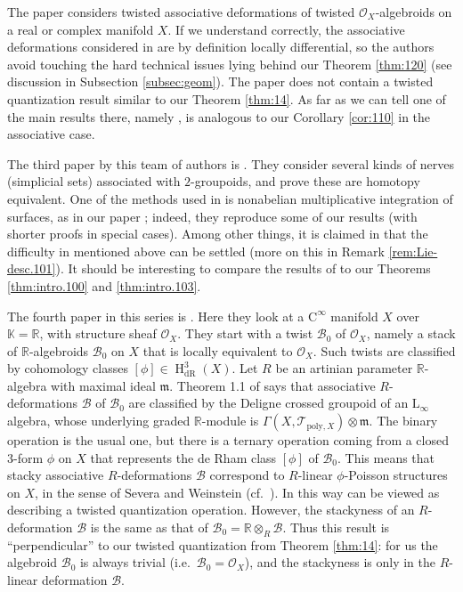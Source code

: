 \documentclass[a4paper, 10pt]{amsart}
\theoremstyle{definition}
\numberwithin{equation}{section}
\newcommand{\opn}{\operatorname}
\newcommand{\mfrak}[1]{\mathfrak{#1}}
\newcommand{\mcal}[1]{\mathcal{#1}}
\newcommand{\mrm}[1]{\mathrm{#1}}
\newcommand{\mbb}[1]{\mathbb{#1}}
\newcommand{\bsym}[1]{\boldsymbol{#1}}
\newcommand{\ot}{\otimes}
\newcommand{\K}{\mbb{K}}
\newcommand{\R}{\mbb{R}}
\newcommand{\OO}{\mcal{O}}
\newcommand{\Ga}{\Gamma}
\newcommand{\m}{\mfrak{m}}
\newcommand{\gerbe}[1]{\bsym{\mcal{#1}}}
\begin{document}
The paper \cite{BGNT2} considers twisted associative deformations
of twisted $\OO_X$-algebroids on a real or complex  manifold $X$. If we
understand correctly, the associative deformations considered in \cite{BGNT2}
are by definition locally differential, so the authors avoid touching
the hard technical issues lying behind our Theorem \ref{thm:120} 
(see discussion in Subsection \ref{subsec:geom}).
The paper \cite{BGNT2} does not contain a twisted quantization result
similar to our Theorem \ref{thm:14}. As far as we can tell one of the main
results there, namely \cite[Theorem 5.22]{BGNT2}, is analogous to our Corollary
\ref{cor:110} in the associative case. 

The third paper by this team of authors is \cite{BGNT3}. 
They consider several kinds of nerves (simplicial sets) associated with
$2$-groupoids, and prove these are homotopy equivalent. One of the methods used
in \cite{BGNT3} is nonabelian multiplicative integration of surfaces, as in our
paper \cite{Ye6}; indeed, they reproduce some of our results (with shorter
proofs in special cases). Among other things, it is claimed in \cite{BGNT3}
that the difficulty in \cite{Ge2} mentioned above can be settled (more on this
in Remark \ref{rem:Lie-desc.101}). 
It should be interesting to compare the results of \cite{BGNT3} to our Theorems 
\ref{thm:intro.100} and \ref{thm:intro.103}.

The fourth paper in this series is \cite{BGNT4}. Here they look at a 
$\mrm{C}^{\infty}$ manifold $X$ over $\K = \R$, with structure sheaf $\OO_{X}$. 
They start with a twist $\gerbe{B}_0$ of $\OO_{X}$, namely 
a stack of $\R$-algebroids $\gerbe{B}_0$ on $X$ that is locally equivalent to 
$\OO_{X}$. Such twists are classified by cohomology classes 
$[\phi] \in \opn{H}^3_{\mrm{dR}}(X)$.
Let $R$ be an artinian parameter $\R$-algebra with maximal ideal $\m$.  
Theorem 1.1 of \cite{BGNT4} says that associative 
$R$-deformations $\gerbe{B}$ of $\gerbe{B}_0$ are classified by 
the Deligne crossed groupoid of an $\mrm{L}_{\infty}$ algebra, 
whose underlying graded $\R$-module is 
$\Ga(X, \mcal{T}_{\mrm{poly}, X}) \ot \m$.
The binary operation is the usual one, but there is a ternary operation 
coming from a closed $3$-form $\phi$ on $X$ that represents the de Rham class 
$[\phi]$ of $\gerbe{B}_0$. This means that stacky associative $R$-deformations 
$\gerbe{B}$ correspond to $R$-linear $\phi$-Poisson structures on $X$, in the 
sense of Severa and Weinstein (cf.\ \cite{Se}). In this way
\cite[Theorem 1.1]{BGNT4} can be viewed as describing a twisted quantization 
operation.  However, the stackyness of an $R$-deformation $\gerbe{B}$ is the 
same as that of $\gerbe{B}_0 = \R \ot_{R} \gerbe{B}$. Thus this result is 
``perpendicular'' to our twisted quantization from Theorem \ref{thm:14}: for us 
the algebroid $\gerbe{B}_0$ is always trivial (i.e.\ $\gerbe{B}_0 = \OO_X$), and 
the stackyness is only in the $R$-linear deformation $\gerbe{B}$. 
\end{document}
